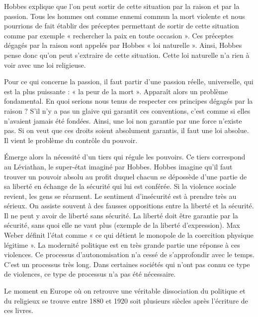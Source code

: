 \documentclass[a4paper,11pt]{article}
\begin{document}
	Hobbes explique que l’on peut sortir de cette situation par la raison et par la passion. Tous les hommes ont comme ennemi commun la mort violente et nous pourrions de fait établir des préceptes permettant de sortir de cette situation comme par exemple « rechercher la paix en toute occasion ». Ces préceptes dégagés par la raison sont appelés par Hobbes « loi naturelle ». Ainsi, Hobbes pense donc qu’on peut s’extraire de cette situation. Cette loi naturelle n’a rien à voir avec une loi religieuse.
	
	Pour ce qui concerne la passion, il faut partir d’une passion réelle, universelle, qui est la plus puissante : « la peur de la mort ». Apparaît alors un problème fondamental. En quoi serions nous tenus de respecter ces principes dégagés par la raison ?
	S’il n’y a pas un glaive qui garantit ces conventions, c’est comme si elles n’avaient jamais été fondées. Ainsi, une loi non garantie par une force n’existe pas. Si on veut que ces droits soient absolument garantis, il faut une loi absolue. Il vient le problème du contrôle du pouvoir. 
		
	Émerge alors la nécessité d’un tiers qui régule les pouvoirs. Ce tiers correspond au Léviathan, le super-état imaginé par Hobbes. Hobbes imagine qu’il faut trouver un pouvoir absolu au profit duquel chacun se dépossède d’une partie de sa liberté en échange de la sécurité qui lui est conférée. Si la violence sociale revient, les gens se réarment. Le sentiment d’insécurité est à prendre très au sérieux. On assiste souvent à des fausses oppositions entre la liberté et la sécurité. Il ne peut y avoir de liberté sans sécurité.  La liberté doit être garantie par la sécurité, sans quoi elle ne vaut plus (exemple de la liberté d’expression). Max Weber définit l’état comme « ce qui détient le monopole de la coercition physique légitime ». La modernité politique est en très grande partie une réponse à ces violences. Ce processus d’autonomisation n’a cessé de s’approfondir avec le temps. C’est un processus très long. Dans certaines sociétés qui n’ont pas connu ce type de violences,  ce type de processus n’a pas été nécessaire.
	
	Le moment en Europe où on retrouve une véritable dissociation du politique et du religieux se trouve entre 1880 et 1920 soit plusieurs siècles après l’écriture de ces livres.\\
\end{document}
